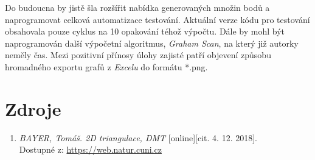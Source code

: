 \documentclass[a4paper, 12pt]{article}
\begin{document}
Do budoucna by jistě šla rozšířit nabídka generovaných množin bodů a naprogramovat celková automatizace testování. Aktuální verze kódu pro testování obsahovala pouze cyklus na 10 opakování téhož výpočtu. Dále by mohl být naprogramován další výpočetní algoritmus, \textit{Graham Scan}, na který již autorky neměly čas. Mezi pozitivní přínosy úlohy zajisté patří objevení způsobu hromadného exportu grafů z \textit{Excelu} do formátu *.png.

\clearpage

\section{Zdroje}
\begin{enumerate}
\item  \textsl{BAYER, Tomáš. 2D triangulace, DMT} [online][cit. 4. 12. 2018].\\
Dostupné z: \href{https://web.natur.cuni.cz/~bayertom/images/courses/Adk/adk5.pdf}{https://web.natur.cuni.cz}



\end{enumerate}
\end{document}
